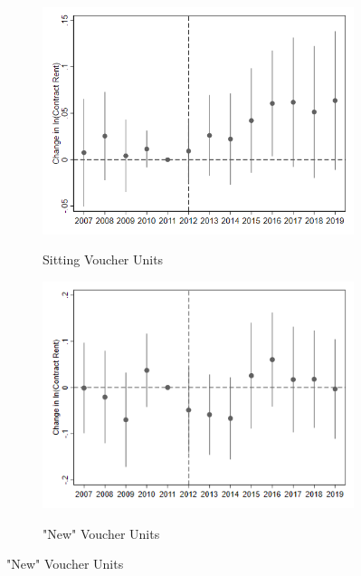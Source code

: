 \documentclass[12pt]{article}
\begin{document}
{{{{{{\begin{figure}[h!]
\begin{center}
\caption{High Surge Voucher Rental Impacts by Tenure}
\begin{subfigure}[b]{0.4\textwidth}
\caption{Sitting Voucher Units}
\includegraphics[scale = 0.41]{Voucher Rents/R3 High Surge Voucher Rents_all vouchers.png}
\label{fig:vouchsit}
\end{subfigure}
\hfill
\begin{subfigure}[b]{0.4\textwidth}
\caption{"New" Voucher Units}
\includegraphics[scale = 0.55]{Voucher Rents/R3 High Surge Voucher Rents_newtobuild.png}
\label{fig:vouchnew}
\end{subfigure}
\end{center}
\end{figure}

}}}}}}
\end{document}
